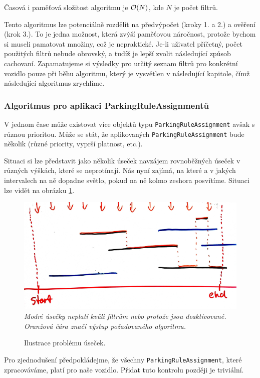 Časová i paměťová složitost algoritmu je ${\cal O}(N)$, kde $N$ je počet filtrů.

Tento algoritmus lze potenciálně rozdělit na předvýpočet (kroky 1. a 2.) a ověření (krok 3.).
To je jedna možnost, která zvýší paměťovou náročnost, protože bychom si museli pamatovat množiny, což je nepraktické.
Je-li uživatel příčetný, počet použitých filtrů nebude obrovský, a tudíž je lepší zvolit následující způsob cachovaní.
Zapamatujeme si výsledky pro určitý seznam filtrů pro konkrétní vozidlo pouze při běhu algoritmu, který je
vysvětlen v následující kapitole, čímž následující algoritmus zrychlíme.

\subsubsection*{Algoritmus pro aplikaci ParkingRuleAssignmentů}

V jednom čase může existovat více objektů typu \texttt{ParkingRuleAssignment} avšak s různou prioritou.
Může se stát, že aplikovaných \texttt{ParkingRuleAssignment} bude několik (různé priority, vyprší platnost, etc.).

Situaci si lze představit jako několik úseček navzájem rovnoběžných úseček v různých výškách, které se neprotínají.
Nás nyní zajímá, na které a v jakých intervalech na ně dopadne světlo, pokud na ně kolmo zeshora posvítíme.
Situaci lze vidět na obrázku \ref{fig:rules_drawing}.

\begin{figure} \centering
  \includegraphics[width=145mm]{../img/rules_drawing.jpg}
  \textit{Modré úsečky neplatí kvůli filtrům nebo protože jsou deaktivované. Oranžová čára značí výstup požadovaného algoritmu.}
  \caption{Ilustrace problému úseček. }
  \label{fig:rules_drawing}
\end{figure}

Pro zjednodušení předpokládejme, že všechny \texttt{ParkingRuleAssignment}, které zpracováváme, platí pro naše vozidlo.
Přidat tuto kontrolu později je triviální.

